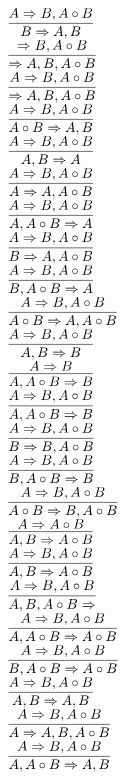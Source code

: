 \documentclass[11pt]{article}
\begin{document}
\begin{center}
\bigskip
\\$\infer{B\Rightarrow A, B}{A\Rightarrow B, A\circ B}$
\bigskip
\\$\infer{\Rightarrow A, B, A\circ B}{\Rightarrow B, A\circ B}$
\bigskip
\\$\infer{\Rightarrow A, B, A\circ B}{A\Rightarrow B, A\circ B}$
\bigskip
\\$\infer{A\circ B\Rightarrow A, B}{A\Rightarrow B, A\circ B}$
\bigskip
\\$\infer{A, B\Rightarrow A}{A\Rightarrow B, A\circ B}$
\bigskip
\\$\infer{A\Rightarrow A, A\circ B}{A\Rightarrow B, A\circ B}$
\bigskip
\\$\infer{A, A\circ B\Rightarrow A}{A\Rightarrow B, A\circ B}$
\bigskip
\\$\infer{B\Rightarrow A, A\circ B}{A\Rightarrow B, A\circ B}$
\bigskip
\\$\infer{B, A\circ B\Rightarrow A}{A\Rightarrow B, A\circ B}$
\bigskip
\\$\infer{A\circ B\Rightarrow A, A\circ B}{A\Rightarrow B, A\circ B}$
\bigskip
\\$\infer{A, B\Rightarrow B}{A\Rightarrow B, A\circ B}$
\bigskip
\\$\infer{A, A\circ B\Rightarrow B}{A\Rightarrow B}$
\bigskip
\\$\infer{A, A\circ B\Rightarrow B}{A\Rightarrow B, A\circ B}$
\bigskip
\\$\infer{B\Rightarrow B, A\circ B}{A\Rightarrow B, A\circ B}$
\bigskip
\\$\infer{B, A\circ B\Rightarrow B}{A\Rightarrow B, A\circ B}$
\bigskip
\\$\infer{A\circ B\Rightarrow B, A\circ B}{A\Rightarrow B, A\circ B}$
\bigskip
\\$\infer{A, B\Rightarrow A\circ B}{A\Rightarrow A\circ B}$
\bigskip
\\$\infer{A, B\Rightarrow A\circ B}{A\Rightarrow B, A\circ B}$
\bigskip
\\$\infer{A, B, A\circ B\Rightarrow }{A\Rightarrow B, A\circ B}$
\bigskip
\\$\infer{A, A\circ B\Rightarrow A\circ B}{A\Rightarrow B, A\circ B}$
\bigskip
\\$\infer{B, A\circ B\Rightarrow A\circ B}{A\Rightarrow B, A\circ B}$
\bigskip
\\$\infer{A, B\Rightarrow A, B}{A\Rightarrow B, A\circ B}$
\bigskip
\\$\infer{A\Rightarrow A, B, A\circ B}{A\Rightarrow B, A\circ B}$
\bigskip
\\$\infer{A, A\circ B\Rightarrow A, B}{A\Rightarrow B, A\circ B}$

\end{center}
\end{document}
